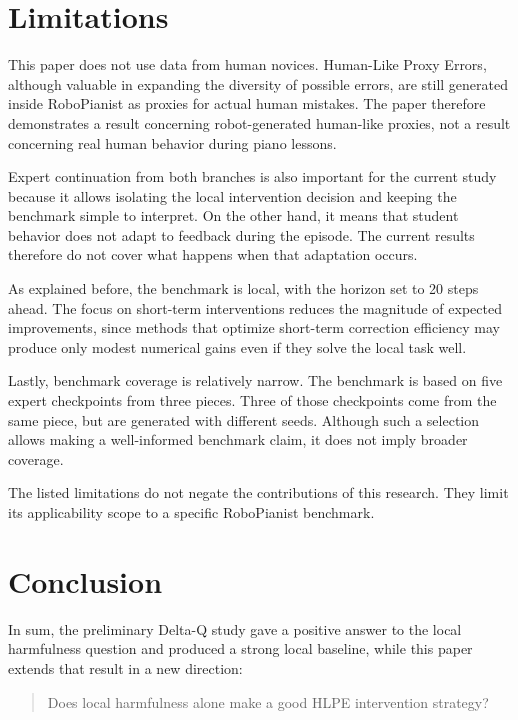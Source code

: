 \documentclass[11pt]{article}
\begin{document}
\section{Limitations}

This paper does not use data from human novices. Human-Like Proxy Errors, although valuable in expanding the diversity of possible errors, are still generated inside RoboPianist as proxies for actual human mistakes. The paper therefore demonstrates a result concerning robot-generated human-like proxies, not a result concerning real human behavior during piano lessons.

Expert continuation from both branches is also important for the current study because it allows isolating the local intervention decision and keeping the benchmark simple to interpret. On the other hand, it means that student behavior does not adapt to feedback during the episode. The current results therefore do not cover what happens when that adaptation occurs.

As explained before, the benchmark is local, with the horizon set to 20 steps ahead. The focus on short-term interventions reduces the magnitude of expected improvements, since methods that optimize short-term correction efficiency may produce only modest numerical gains even if they solve the local task well.

Lastly, benchmark coverage is relatively narrow. The benchmark is based on five expert checkpoints from three pieces. Three of those checkpoints come from the same piece, but are generated with different seeds. Although such a selection allows making a well-informed benchmark claim, it does not imply broader coverage.

The listed limitations do not negate the contributions of this research. They limit its applicability scope to a specific RoboPianist benchmark.

\section{Conclusion}

In sum, the preliminary Delta-Q study gave a positive answer to the local harmfulness question and produced a strong local baseline, while this paper extends that result in a new direction:

\begin{quote}
Does local harmfulness alone make a good HLPE intervention strategy?
\end{quote}
\end{document}
